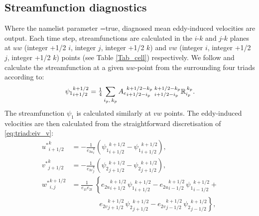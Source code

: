 \subsection{Streamfunction diagnostics}\label{sec:triad:sfdiag}
Where the namelist parameter =true, diagnosed
mean eddy-induced velocities are output. Each time step,
streamfunctions are calculated in the $i$-$k$ and $j$-$k$ planes at
$uw$ (integer +1/2 $i$, integer $j$, integer +1/2 $k$) and $vw$
(integer $i$, integer +1/2 $j$, integer +1/2 $k$) points (see Table
\ref{Tab_cell}) respectively. We follow \citep{Griffies_Bk04} and
calculate the streamfunction at a given $uw$-point from the
surrounding four triads according to:
\begin{equation}
  \label{eq:triad:sfdiagi}
  {\psi_1}_{i+1/2}^{k+1/2}={\textstyle\frac{1}{4}}\sum_{\substack{i_p,\,k_p}}
  {A_e}_{i+1/2-i_p}^{k+1/2-k_p}\:{}_{i+1/2-i_p}^{k+1/2-k_p}{\mathbb{R}}_{i_p}^{\,k_p}.
\end{equation}
The streamfunction $\psi_1$ is calculated similarly at $vw$ points.
The eddy-induced velocities are then calculated from the
straightforward discretisation of \eqref{eq:triad:eiv_v}:
\begin{equation}\label{eq:triad:eiv_v_discrete}
\begin{split}
 {u^*}_{i+1/2}^{k} & = - \frac{1}{{e_{3u}}_{i}^{k}}\left({\psi_1}_{i+1/2}^{k+1/2}-{\psi_1}_{i+1/2}^{k+1/2}\right),   \\
 {v^*}_{j+1/2}^{k} & = - \frac{1}{{e_{3v}}_{j}^{k}}\left({\psi_2}_{j+1/2}^{k+1/2}-{\psi_2}_{j+1/2}^{k+1/2}\right),   \\
 {w^*}_{i,j}^{k+1/2} & =    \frac{1}{e_{1t}e_{2t}}\; \left\{
 {e_{2u}}_{i+1/2}^{k+1/2} \,{\psi_1}_{i+1/2}^{k+1/2} -
 {e_{2u}}_{i-1/2}^{k+1/2} \,{\psi_1}_{i-1/2}^{k+1/2} \right. + \\
\phantom{=} & \qquad\qquad\left. {e_{2v}}_{j+1/2}^{k+1/2} \,{\psi_2}_{j+1/2}^{k+1/2} - {e_{2v}}_{j-1/2}^{k+1/2} \,{\psi_2}_{j-1/2}^{k+1/2} \right\},
\end{split}
\end{equation}
